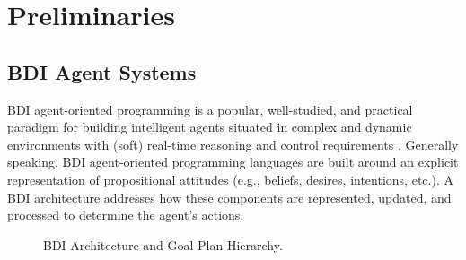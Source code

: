 \section{Preliminaries}\label{sec:preliminaries}

\newcommand{\success}{\mbox{\emph{succ}}}
\newcommand{\failure}{\mbox{\emph{fail}}}

\newcommand{\procedurefont}[1]{\mathsf{#1}}
\newcommand{\StableGoal}{\procedurefont{StableGoal}}
\newcommand{\RecordTrace}{\procedurefont{RecordFailedTrace}}
\newcommand{\RecordWorldDT}{\procedurefont{RecordWorldDT}}



\subsection{BDI Agent Systems}\label{sec:bdi_programming}

BDI agent-oriented programming is a popular, well-studied, and practical paradigm
for building intelligent agents situated in complex and dynamic environments with
(soft) real-time reasoning and control requirements
\cite{Georgeff89-PRS,Benfield:AAMAS06}.
Generally speaking, BDI agent-oriented programming languages are built
around an 
explicit representation of propositional attitudes (e.g., beliefs, desires,
intentions, etc.). A BDI architecture addresses how these components are
represented, updated, and processed to determine the agent's actions.


\begin{figure*}[t]
\begin{center}
%
\vskip -0.2cm
\caption{BDI Architecture and Goal-Plan Hierarchy.}
\label{fig:BDI-concepts}
\end{center}
\end{figure*}



